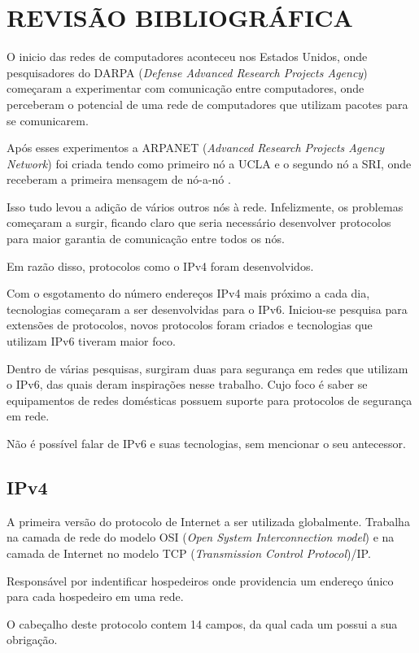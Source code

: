 \chapter{REVISÃO BIBLIOGRÁFICA}\label{ch:rev-bibs}

O inicio das redes de computadores aconteceu nos Estados Unidos, onde pesquisadores do DARPA (\textit{Defense Advanced Research Projects Agency}) começaram a experimentar com comunicação entre computadores, onde perceberam o potencial de uma rede de computadores que utilizam pacotes para se comunicarem.

Após esses experimentos a ARPANET (\textit{Advanced Research Projects Agency Network}) foi criada tendo como primeiro nó a UCLA e o segundo nó a SRI, onde receberam a primeira mensagem de nó-a-nó \cite{comeco-internet}.

Isso tudo levou a adição de vários outros nós à rede. Infelizmente, os problemas começaram a surgir, ficando claro que seria necessário desenvolver protocolos para maior garantia de comunicação entre todos os nós.

Em razão disso, protocolos como o IPv4 foram desenvolvidos.

Com o esgotamento do número endereços IPv4 mais próximo a cada dia, tecnologias começaram a ser desenvolvidas para o IPv6. Iniciou-se pesquisa para extensões de protocolos, novos protocolos foram criados e tecnologias que utilizam IPv6 tiveram maior foco.

Dentro de várias pesquisas, surgiram duas para segurança em redes que utilizam o IPv6, das quais deram inspirações nesse trabalho. Cujo foco é saber se equipamentos de redes domésticas possuem suporte para protocolos de segurança em rede.

Não é possível falar de IPv6 e suas tecnologias, sem mencionar o seu antecessor.

\section{IPv4}\label{sec:protIPv4}

A primeira versão do protocolo de Internet a ser utilizada globalmente. Trabalha na camada de rede do modelo OSI (\textit{Open System Interconnection model}) e na camada de Internet no modelo TCP (\textit{Transmission Control Protocol})/IP.

Responsável por indentificar hospedeiros onde providencia um endereço único para cada hospedeiro em uma rede.

O cabeçalho deste protocolo contem 14 campos, da qual cada um possui a sua obrigação.

